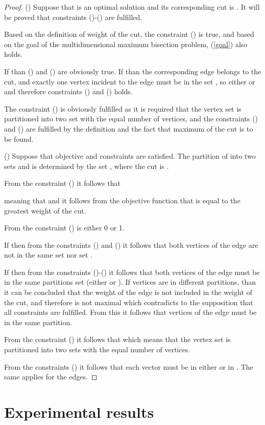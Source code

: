\documentclass[10pt]{article}
\begin{document}
\begin{proof}
()
Suppose that  is an optimal solution and its corresponding cut is . It will be proved that constraints  ()-() are fulfilled. 


Based on the definition of weight of the cut, the constraint () is true, and based on the goal of the multidimensional maximum bisection problem, (\ref{goal}) also holds.

If   than () and () are obviously true.
If   than the corresponding edge  belongs to the cut, and exactly one vertex incident to the edge  must be in the set , 
so either  or  and therefore constraints () and () holds.

The constraint () is obviously fulfilled as it is required that the vertex set is partitioned into two set with the equal number of vertices,
and the constraints () and () are fulfilled by the definition and the fact that maximum of the cut is to be found. 

() Suppose that objective and constraints are satisfied. The partition of  into two sets  and
 is determined by the set 
, where the cut is .

From the constraint () it follows that 

meaning that  and it follows from the objective function that  is equal to the greatest weight of the cut.

From the constraint ()  is either 0 or 1.

If  then from the constraints ()  and () it follows that both vertices of the edge  are not in the same set  nor set .  

If  then from the constraints ()-() it follows that both vertices of the edge  must be in the same partitions set (either  or ). If vertices are in different partitions, than it can be concluded that the weight of the edge  is not included in the weight of the cut, and therefore  is not maximal which contradicts to the supposition that all constraints are fulfilled. From this it follows that vertices of the edge must be in the same partition.  

From the constraint () it follows that  which means 
that the vertex set is partitioned into two sets with the equal number of vertices.

From the constraints () it follows that each vector must be in either  or in . The same applies for the edges.
\end{proof}


\section{Experimental results}
\end{document}

